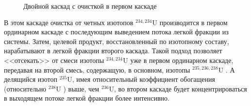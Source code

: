 \begin{figure}[ht]
  \caption{Двойной каскад с очисткой в первом каскаде}\label{fig:pure_double}
\end{figure}

В этом каскаде очистка от четных изотопов $^{234,234}$U производится в первом ординарном каскаде с последующим выведением потока легкой фракции из системы. Затем, целевой продукт, восстановленный по изотопному составу, нарабатывают в легкой фракции второго каскада. Такой подход позволяет <<отсекать>> от смеси изотопы $^{234,234}$U уже в первом ординарном каскаде, передавая на второй смесь, содержащую, в основном, изотопы $^{235,236,238}$U \cite{borodynyaIssledovanieProblemyVovlecheniya1989}. А делящийся изотоп $^{235}$U, имея относительный коэффициент обогащения (относительно $^{238}$U ) выше, чем $^{236}$U, во втором каскаде будет концентрироваться в выходящем потоке легкой фракции более интенсивно.




